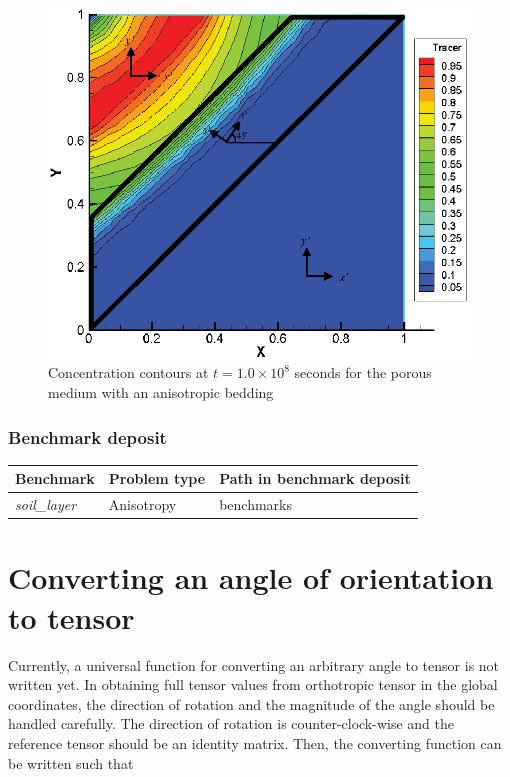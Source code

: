 \begin{figure}[H]
\centering
\includegraphics[scale=0.60]{Anisotropy/figures/layeredanisotropictransport.eps}
\caption{Concentration contours at $t = 1.0 \times 10^8 $ seconds for the porous medium with an anisotropic bedding}
\label{layeredanisotropictransport}
\end{figure}

\subsubsection*{Benchmark deposit}
\begin{tabular}{|l|l|l|}
  \hline
  Benchmark & Problem type & Path in benchmark deposit \\
  \hline
 \emph{soil\_layer}& Anisotropy & benchmarks\verb \Anisotropy\moleculardiffusion \\
  \hline
\end{tabular}

\section{Converting an angle of orientation to tensor}
Currently, a universal function for converting an arbitrary angle to tensor is not written yet. In obtaining full tensor values from orthotropic tensor in the global coordinates, the direction of rotation and the magnitude of the angle should be handled carefully. The direction of rotation is counter-clock-wise and the reference tensor should be an identity matrix. Then, the converting function can be written such that

